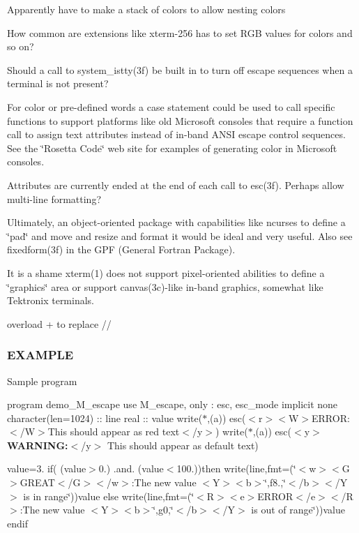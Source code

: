 Apparently have to make a stack of colors to allow nesting colors

How common are extensions like xterm-\/256 has to set R\+GB values for colors and so on?

Should a call to system\+\_\+istty(3f) be built in to turn off escape sequences when a terminal is not present?

For color or pre-\/defined words a case statement could be used to call specific functions to support platforms like old Microsoft consoles that require a function call to assign text attributes instead of in-\/band A\+N\+SI escape control sequences. See the \char`\"{}\+Rosetta Code\char`\"{} web site for examples of generating color in Microsoft consoles.

Attributes are currently ended at the end of each call to esc(3f). Perhaps allow multi-\/line formatting?

Ultimately, an object-\/oriented package with capabilities like ncurses to define a \char`\"{}pad\char`\"{} and move and resize and format it would be ideal and very useful. Also see fixedform(3f) in the G\+PF (General Fortran Package).

It is a shame xterm(1) does not support pixel-\/oriented abilities to define a \char`\"{}graphics\char`\"{} area or support canvas(3c)-\/like in-\/band graphics, somewhat like Tektronix terminals.

overload + to replace //

\subsubsection*{E\+X\+A\+M\+P\+LE}

Sample program

program demo\+\_\+\+M\+\_\+escape use M\+\_\+escape, only \+: esc, esc\+\_\+mode implicit none character(len=1024) \+:\+: line real \+:\+: value write($\ast$,\textquotesingle{}(a)\textquotesingle{}) esc(\textquotesingle{}$<$r$>$$<$\+W$>$E\+R\+R\+OR\+:$<$/\+W$>$This should appear as red text$<$/y$>$\textquotesingle{}) write($\ast$,\textquotesingle{}(a)\textquotesingle{}) esc(\textquotesingle{}$<$y$>${\bfseries W\+A\+R\+N\+I\+NG\+:}$<$/y$>$ This should appear as default text\textquotesingle{})

value=3. if( (value$>$0.) .and. (value$<$100.))then write(line,fmt=\textquotesingle{}(\char`\"{}$<$w$>$$<$\+G$>$\+G\+R\+E\+A\+T$<$/\+G$>$$<$/w$>$\+:\+The new value $<$\+Y$>$$<$b$>$\char`\"{},f8.,\char`\"{}$<$/b$>$$<$/\+Y$>$ is in range\char`\"{})\textquotesingle{})value else write(line,fmt=\textquotesingle{}(\char`\"{}$<$\+R$>$$<$e$>$\+E\+R\+R\+O\+R$<$/e$>$$<$/\+R$>$\+:\+The new value $<$\+Y$>$$<$b$>$\char`\"{},g0,\char`\"{}$<$/b$>$$<$/\+Y$>$ is out of range\char`\"{})\textquotesingle{})value endif


